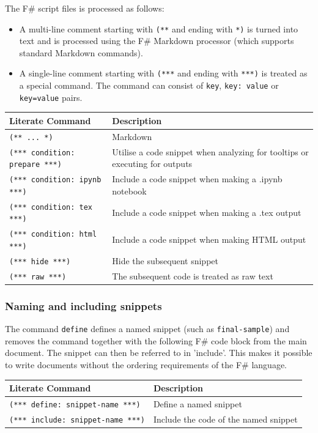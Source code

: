 \documentclass{article}
\begin{document}
The F\# script files is processed as follows:
\begin{itemize}
\item 

A multi-line comment starting with \texttt{(**} and ending with \texttt{*)} is
turned into text and is processed using the F\# Markdown processor
(which supports standard Markdown commands).

\item 

A single-line comment starting with \texttt{(***} and ending with \texttt{***)}
is treated as a special command. The command can consist of
\texttt{key}, \texttt{key: value} or \texttt{key=value} pairs.

\end{itemize}

\begin{tabular}{|l|l|}\hline
\textbf{Literate Command} & \textbf{Description}\\ \hline\hline
\texttt{(** ... *)} & Markdown\\ \hline
\texttt{(*** condition: prepare ***)} & Utilise a code snippet when analyzing for tooltips or executing for outputs\\ \hline
\texttt{(*** condition: ipynb ***)} & Include a code snippet when making a .ipynb notebook\\ \hline
\texttt{(*** condition: tex ***)} & Include a code snippet when making a .tex output\\ \hline
\texttt{(*** condition: html ***)} & Include a code snippet when making HTML output\\ \hline
\texttt{(*** hide ***)} & Hide the subsequent snippet\\ \hline
\texttt{(*** raw ***)} & The subsequent code is treated as raw text\\ \hline
\end{tabular}

\subsubsection*{Naming and including snippets}



The command \texttt{define} defines a named snippet (such as \texttt{final-sample}) and removes the command together with
the following F\# code block from the main document. The snippet can then
be referred to in 'include'. This makes it
possible to write documents without the ordering requirements of the
F\# language.
\begin{tabular}{|l|l|}\hline
\textbf{Literate Command} & \textbf{Description}\\ \hline\hline
\texttt{(*** define: snippet-name ***)} & Define a named snippet\\ \hline
\texttt{(*** include: snippet-name ***)} & Include the code of the named snippet\\ \hline
\end{tabular}
\end{document}
